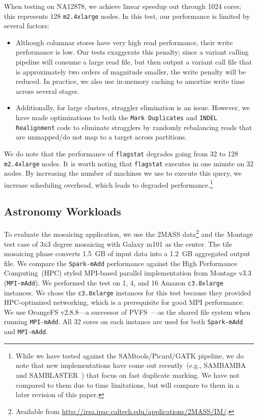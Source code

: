 \documentclass[10pt]{report} %
\begin{document}
When testing on NA12878, we achieve linear speedup out through 1024 cores; this represents 128
\texttt{m2.4xlarge} nodes. In this test, our performance is limited by several factors:

\begin{itemize}
\item Although columnar stores have very high read performance, their write performance is low. Our
tests exaggerate this penalty; since a variant calling pipeline will consume a large read file, but then output a
variant call file that is approximately two orders of magnitude smaller, the write penalty will be reduced. In
practice, we also use in-memory caching to amortize write time across several stages.
\item Additionally, for large clusters, straggler elimination is an issue. However, we have made optimizations to
both the \texttt{Mark Duplicates} and \texttt{INDEL Realignment} code to eliminate stragglers by randomly
rebalancing reads that are unmapped/do not map to a target across partitions.
\end{itemize}

We do note that the performance of \texttt{flagstat} degrades going from 32 to 128 \texttt{m2.4xlarge} nodes.
It is worth noting that \texttt{flagstat} executes in one minute on 32 nodes. By increasing the number of machines
we use to execute this query, we increase scheduling overhead, which leads to degraded
performance.\footnote{While we
have tested against the SAMtools/Picard/GATK pipeline, we do note that new implementations have come out
recently~(e.g., SAMBAMBA and SAMBLASTER~\cite{faust14}) that focus on fast duplicate marking. We have not
compared to them due to time limitations, but will compare to them in a later revision of this paper.}

\subsection{Astronomy Workloads}
\label{sec:astro-workloads}

To evaluate the mosaicing application, we use the 2MASS data\footnote{Available from
\url{http://irsa.ipac.caltech.edu/applications/2MASS/IM/}.} and the Montage test case of 3x3 degree
mosaicing with Galaxy m101 as the center. The tile mosaicing phase converts 1.5~GB of input data into a
1.2~GB aggregated output file. We compare the \texttt{Spark-mAdd} performance against the High Performance
Computing~(HPC) styled MPI-based parallel implementation from Montage v3.3 (\texttt{MPI-mAdd}). We
performed the test on 1, 4, and 16 Amazon \texttt{c3.8xlarge} instances. We chose the \texttt{c3.8xlarge} instances
for this test because they provided HPC-optimized networking, which is a prerequisite for good MPI performance.
We use OrangeFS v2.8.8---a successor of PVFS~\cite{PVFS}---as the shared file system when running
\texttt{MPI-mAdd}. All 32 cores on each instance are used for both \texttt{Spark-mAdd} and \texttt{MPI-mAdd}.
\end{document}
